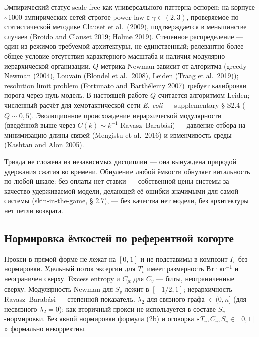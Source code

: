 \documentclass[pdflatex,sn-mathphys-ay]{sn-jnl}
\begin{document}
Эмпирический статус scale-free как универсального паттерна оспорен: на корпусе \textasciitilde1000 эмпирических сетей строгое power-law с \(\gamma \in (2, 3)\), проверяемое по статистической методике Clauset et al.~(2009), подтверждается в меньшинстве случаев (Broido and Clauset 2019; Holme 2019). Степенное распределение --- один из режимов требуемой архитектуры, не единственный; релевантно более общее условие отсутствия характерного масштаба и наличия модулярно-иерархической организации. \(Q\)-метрика Newman зависит от алгоритма (greedy Newman (2004), Louvain (Blondel et al.~2008), Leiden (Traag et al.~2019)); resolution limit problem (Fortunato and Barthélemy 2007) требует калибровки порога через нуль-модель. В настоящей работе \(Q\) считается алгоритмом Leiden; численный расчёт для хемотактической сети \emph{E. coli} --- supplementary § S2.4 (\(Q \sim 0{,}5\)). Эволюционное происхождение иерархической модулярности (введённой выше через \(C(k) \sim k^{-1}\) Ravasz--Barabási) --- давление отбора на минимизацию длины связей (Mengistu et al.~2016) и изменчивость среды (Kashtan and Alon 2005).

Триада не сложена из независимых дисциплин --- она вынуждена природой удержания сжатия во времени. Обнуление любой ёмкости обнуляет витальность по любой шкале: без оплаты нет ставки --- собственной цены системы за качество удерживаемой модели, делающей её ошибки значимыми для самой системы (skin-in-the-game, § 2.7), --- без качества нет модели, без архитектуры нет петли возврата.

\subsection{Нормировка ёмкостей по референтной когорте}\label{ux43dux43eux440ux43cux438ux440ux43eux432ux43aux430-ux451ux43cux43aux43eux441ux442ux435ux439-ux43fux43e-ux440ux435ux444ux435ux440ux435ux43dux442ux43dux43eux439-ux43aux43eux433ux43eux440ux442ux435}

Прокси в прямой форме не лежат на \([0, 1]\) и не подставимы в композит \(I_v\) без нормировки. Удельный поток эксергии для \(T_v\) имеет размерность Вт·кг\(^{-1}\) и неограничен сверху. Excess entropy и \(C_\mu\) для \(C_v\) --- биты, неограниченные сверху. Модулярность Newman для \(S_v\) лежит в \([-1/2, 1]\); иерархичность Ravasz--Barabási --- степенной показатель. \(\lambda_2\) для связного графа \(\in (0, n]\) (для несвязного \(\lambda_2 = 0\)); как вторичный прокси не используется в составе \(S_v\)-нормировки. Без явной нормировки формула (2b) и оговорка «\(T_v, C_v, S_v \in [0, 1]\)» формально некорректны.
\end{document}
